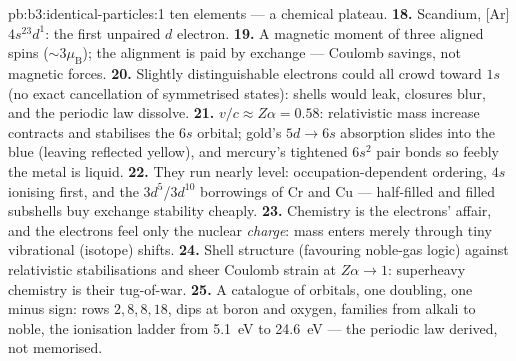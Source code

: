 \begin{solution}{pb:b3:identical-particles:1}
ten elements --- a chemical plateau.
\textbf{18.} Scandium, [Ar]$4s^23d^1$: the first unpaired $d$
electron.
\textbf{19.} A magnetic moment of three aligned spins
($\sim3\mu_{\text{B}}$); the alignment is paid by exchange ---
Coulomb savings, not magnetic forces.
\textbf{20.} Slightly distinguishable electrons could all crowd
toward $1s$ (no exact cancellation of symmetrised states): shells
would leak, closures blur, and the periodic law dissolve.
\textbf{21.} $v/c \approx Z\alpha = 0.58$: relativistic mass
increase contracts and stabilises the $6s$ orbital; gold's
$5d \to 6s$ absorption slides into the blue (leaving reflected
yellow), and mercury's tightened $6s^2$ pair bonds so feebly the
metal is liquid.
\textbf{22.} They run nearly level: occupation-dependent
ordering, $4s$ ionising first, and the $3d^5$/$3d^{10}$ borrowings
of Cr and Cu --- half-filled and filled subshells buy exchange
stability cheaply.
\textbf{23.} Chemistry is the electrons' affair, and the
electrons feel only the nuclear \emph{charge}: mass enters merely
through tiny vibrational (isotope) shifts.
\textbf{24.} Shell structure (favouring noble-gas logic) against
relativistic stabilisations and sheer Coulomb strain at
$Z\alpha \to 1$: superheavy chemistry is their tug-of-war.
\textbf{25.} A catalogue of orbitals, one doubling, one minus
sign: rows $2, 8, 8, 18$, dips at boron and oxygen, families from
alkali to noble, the ionisation ladder from \qty{5.1}{eV} to
\qty{24.6}{eV} --- the periodic law derived, not memorised.
\end{solution}

